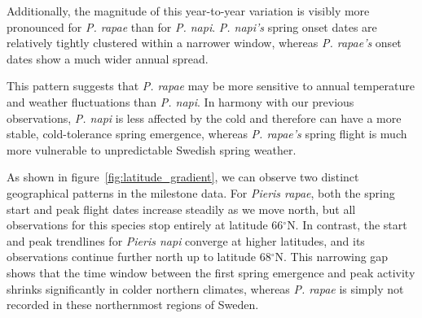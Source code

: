 \documentclass{article}
\begin{document}
Additionally, the magnitude of this year-to-year variation is visibly more pronounced for \textit{P. rapae} than for \textit{P. napi}. \textit{P. napi's} spring onset dates are relatively tightly clustered within a narrower window, whereas \textit{P. rapae's} onset dates show a much wider annual spread. 

This pattern suggests that \textit{P. rapae} may be more sensitive to annual temperature and weather fluctuations than \textit{P. napi}. In harmony with our previous observations, \textit{P. napi} is less affected by the cold and therefore can have a more stable, cold-tolerance spring emergence, whereas \textit{P. rapae's} spring flight is much more vulnerable to unpredictable Swedish spring weather.

As shown in figure~\ref{fig:latitude_gradient}, we can observe two distinct geographical patterns in the milestone data. For \textit{Pieris rapae}, both the spring start and peak flight dates increase steadily as we move north, but all observations for this species stop entirely at latitude 66$^\circ$N. In contrast, the start and peak trendlines for \textit{Pieris napi} converge at higher latitudes, and its observations continue further north up to latitude 68$^\circ$N. This narrowing gap shows that the time window between the first spring emergence and peak activity shrinks significantly in colder northern climates, whereas \textit{P. rapae} is simply not recorded in these northernmost regions of Sweden.

\pagebreak
\printbibliography
\end{document}
